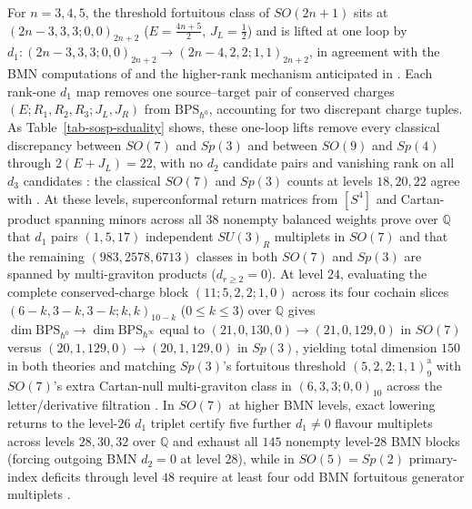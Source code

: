 \documentclass[11pt]{article}
\numberwithin{equation}{section}
\numberwithin{figure}{section}
\numberwithin{table}{section}
\begin{document}
For $n=3,4,5$, the threshold fortuitous class of $SO(2n+1)$ sits at $(2n-3,3,3;0,0)_{2n+2}$ ($E=\tfrac{4n+5}2$, $J_L=\tfrac12$) and is lifted at one loop by $d_1:(2n-3,3,3;0,0)_{2n+2}\to(2n-4,2,2;1,1)_{2n+2}$, in agreement with the BMN computations of \cite[Sections 6.2 and 6.6]{FortuityAI} and the higher-rank mechanism anticipated in \cite[Section 5.3]{KvLM}. Each rank-one $d_1$ map removes one source--target pair of conserved charges $(E;R_1,R_2,R_3;J_L,J_R)$ from $\mathrm{BPS}_{\hbar^0}$, accounting for two discrepant charge tuples. As Table~\ref{tab-sosp-sduality} shows, these one-loop lifts remove every classical discrepancy between $SO(7)$ and $Sp(3)$ and between $SO(9)$ and $Sp(4)$ through $2(E+J_L)=22$, with no $d_2$ candidate pairs and vanishing rank on all $d_3$ candidates \cite[supplement, Section S3.3]{Repo}: the classical $SO(7)$ and $Sp(3)$ counts at levels $18,20,22$ agree with \cite[Section 6.7]{FortuityAI}. At these levels, superconformal return matrices from $[S^4]$ and Cartan-product spanning minors across all $38$ nonempty balanced weights prove over $\mathbb Q$ that $d_1$ pairs $(1,5,17)$ independent $SU(3)_R$ multiplets in $SO(7)$ and that the remaining $(983,2578,6713)$ classes in both $SO(7)$ and $Sp(3)$ are spanned by multi-graviton products ($d_{r\ge2}=0$). At level $24$, evaluating the complete conserved-charge block $(11;5,2,2;1,0)$ across its four cochain slices $(6-k,3-k,3-k;k,k)_{10-k}$ ($0\le k\le3$) over $\mathbb Q$ gives $\dim\mathrm{BPS}_{\hbar^0}\to\dim\mathrm{BPS}_{\hbar^\infty}$ equal to $(21,0,130,0)\to(21,0,129,0)$ in $SO(7)$ versus $(20,1,129,0)\to(20,1,129,0)$ in $Sp(3)$, yielding total dimension $150$ in both theories and matching $Sp(3)$'s fortuitous threshold $(5,2,2;1,1)_9^{\mathrm a}$ with $SO(7)$'s extra Cartan-null multi-graviton class in $(6,3,3;0,0)_{10}$ across the letter/derivative filtration \cite{Repo}. In $SO(7)$ at higher BMN levels, exact lowering returns to the level-$26$ $d_1$ triplet certify five further $d_1\ne0$ flavour multiplets across levels $28,30,32$ over $\mathbb Q$ and exhaust all $145$ nonempty level-$28$ BMN blocks (forcing outgoing BMN $d_2=0$ at level $28$), while in $SO(5)=Sp(2)$ primary-index deficits through level $48$ require at least four odd BMN fortuitous generator multiplets \cite{Repo}.
\end{document}
